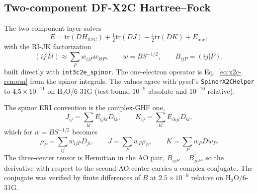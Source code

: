 \subsection{Two-component DF-X2C Hartree--Fock}

The two-component layer solves
\begin{equation}
  E=\mathrm{tr}(DH_{\mathrm{X2C}})
    +\tfrac{1}{2}\mathrm{tr}(DJ)
    -\tfrac{1}{2}\mathrm{tr}(DK)+E_{\mathrm{nuc}},
  \label{eq:x2c-two-component-energy}
\end{equation}
with the RI-JK factorization
\begin{equation}
  (ij|kl)\approx\sum_P w_{ijP}w_{klP},
  \qquad
  w=BS^{-1/2},
  \qquad
  B_{ijP}=(ij|P),
  \label{eq:x2c-two-component-df}
\end{equation}
built directly with \texttt{int3c2e\_spinor}.  The one-electron
operator is Eq.~\eqref{eq:x2c-renorm} from the spinor integrals.  The
values agree with pyscf's \texttt{SpinorX2CHelper} to
$4.5\times10^{-11}$ on H$_2$O/6-31G (test bound $10^{-9}$ absolute and
$10^{-10}$ relative).

The spinor ERI convention is the complex-GHF one,
\begin{equation}
  J_{ij}=\sum_{kl}E_{ijkl}D_{lk},
  \qquad
  K_{ij}=\sum_{kl}E_{ikjl}D_{kl},
  \label{eq:x2c-spinor-jk}
\end{equation}
which for $w=BS^{-1/2}$ becomes
\begin{equation}
  \rho_P=\sum_{ij}w_{ijP}D_{ji},
  \qquad
  J=\sum_Pw_P\rho_P,
  \qquad
  K=\sum_Pw_PDw_P.
  \label{eq:x2c-spinor-jk-factor}
\end{equation}
The three-center tensor is Hermitian in the AO pair,
$B_{ijP}=\overline{B_{jiP}}$, so the derivative with respect to the
second AO center carries a complex conjugate.  The conjugate was
verified by finite differences of $B$ at $2.5\times10^{-9}$ relative
on H$_2$O/6-31G.

